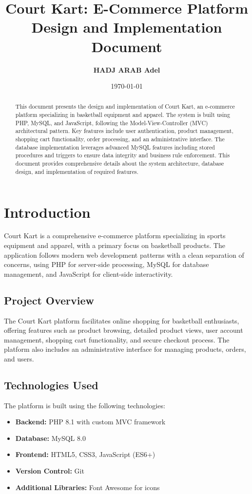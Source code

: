 \documentclass[14pt,a4paper]{article}
\title{\textbf{Court Kart: E-Commerce Platform}\\[0.5em]\Large Design and Implementation Document}
\author{\textbf{HADJ ARAB Adel}}
\date{\today}
\begin{document}
\maketitle

\begin{abstract}
	\noindent This document presents the design and implementation of Court Kart, an e-commerce platform specializing in basketball equipment and apparel. The system is built using PHP, MySQL, and JavaScript, following the Model-View-Controller (MVC) architectural pattern. Key features include user authentication, product management, shopping cart functionality, order processing, and an administrative interface. The database implementation leverages advanced MySQL features including stored procedures and triggers to ensure data integrity and business rule enforcement. This document provides comprehensive details about the system architecture, database design, and implementation of required features.
\end{abstract}

\newpage
\tableofcontents
\newpage

\section{Introduction}

Court Kart is a comprehensive e-commerce platform specializing in sports equipment and apparel, with a primary focus on basketball products. The application follows modern web development patterns with a clean separation of concerns, using PHP for server-side processing, MySQL for database management, and JavaScript for client-side interactivity.

\subsection{Project Overview}
The Court Kart platform facilitates online shopping for basketball enthusiasts, offering features such as product browsing, detailed product views, user account management, shopping cart functionality, and secure checkout process. The platform also includes an administrative interface for managing products, orders, and users.

\subsection{Technologies Used}
The platform is built using the following technologies:
\begin{itemize}
	\item \textbf{Backend:} PHP 8.1 with custom MVC framework
	\item \textbf{Database:} MySQL 8.0
	\item \textbf{Frontend:} HTML5, CSS3, JavaScript (ES6+)
	\item \textbf{Version Control:} Git
	\item \textbf{Additional Libraries:} Font Awesome for icons
\end{itemize}
\end{document}
